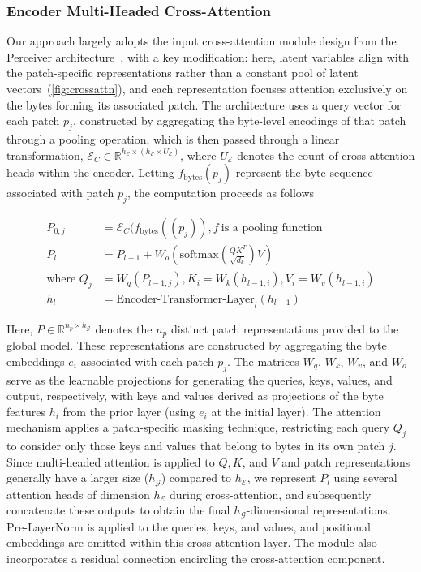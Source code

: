 \subsubsection{Encoder Multi-Headed Cross-Attention}
\label{sec:enc-cross-attn}
Our approach largely adopts the input cross-attention module design from the Perceiver architecture~\citep{jaegle2021perceiver}, with a key modification: here, latent variables align with the patch-specific representations rather than a constant pool of latent vectors~(\autoref{fig:crossattn}), and each representation focuses attention exclusively on the bytes forming its associated patch. The architecture uses a query vector for each patch $p_j$, constructed by aggregating the byte-level encodings of that patch through a pooling operation, which is then passed through a linear transformation, $\mathcal{E}_{C} \in \mathbb{R}^{h_{\mathcal{E}} \times (h_{\mathcal{E}} \times U_{\mathcal{E}})}$, where $U_{\mathcal{E}}$ denotes the count of cross-attention heads within the encoder. Letting $f_{\text{bytes}}(p_j)$ represent the byte sequence associated with patch $p_j$, the computation proceeds as follows

\begin{align}
P_{0,j} &= \mathcal{E}_{C}(f_\text{bytes}((p_j)), f~ \text{is a pooling function} \\
P_l &= P_{l-1} + W_o\left(\text{softmax}\left(\frac{QK^T}{\sqrt{d_k}}\right)V\right) \\
\text{where } Q_j &= W_q(P_{l-1,j}), K_i = W_k(h_{l-1,i}), V_i = W_v(h_{l-1,i}) \\
h_l &= \text{Encoder-Transformer-Layer}_l(h_{l-1})
\end{align}

Here, $P \in \mathbb{R}^{n_p \times h_{\mathcal{G}}}$ denotes the $n_p$ distinct patch representations provided to the global model. These representations are constructed by aggregating the byte embeddings $e_i$ associated with each patch $p_j$. The matrices $W_q$, $W_k$, $W_v$, and $W_o$ serve as the learnable projections for generating the queries, keys, values, and output, respectively, with keys and values derived as projections of the byte features $h_i$ from the prior layer (using $e_i$ at the initial layer). The attention mechanism applies a patch-specific masking technique, restricting each query $Q_j$ to consider only those keys and values that belong to bytes in its own patch $j$. Since multi-headed attention is applied to $Q, K$, and $V$ and patch representations generally have a larger size ($h_{\mathcal{G}}$) compared to $h_{\mathcal{E}}$, we represent $P_l$ using several attention heads of dimension $h_{\mathcal{E}}$ during cross-attention, and subsequently concatenate these outputs to obtain the final $h_{\mathcal{G}}$-dimensional representations. Pre-LayerNorm is applied to the queries, keys, and values, and positional embeddings are omitted within this cross-attention layer. The module also incorporates a residual connection encircling the cross-attention component.

